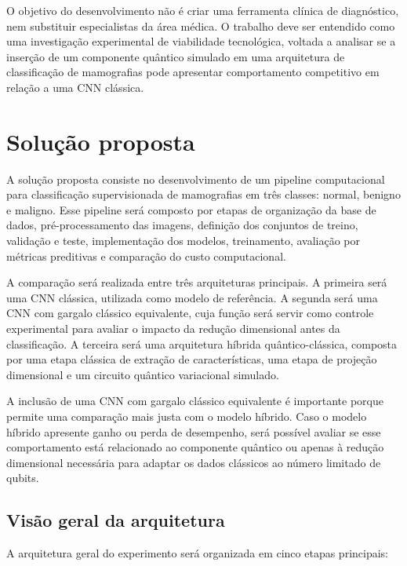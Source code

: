 \documentclass[
    12pt,
    openright,
    oneside,
    a4paper,
    english,
    brazil
]{abntex2}
\begin{document}
O objetivo do desenvolvimento não é criar uma ferramenta clínica de diagnóstico, nem substituir especialistas da área médica. O trabalho deve ser entendido como uma investigação experimental de viabilidade tecnológica, voltada a analisar se a inserção de um componente quântico simulado em uma arquitetura de classificação de mamografias pode apresentar comportamento competitivo em relação a uma CNN clássica.

\section{Solução proposta}
\label{sec:solucao}

A solução proposta consiste no desenvolvimento de um pipeline computacional para classificação supervisionada de mamografias em três classes: normal, benigno e maligno. Esse pipeline será composto por etapas de organização da base de dados, pré-processamento das imagens, definição dos conjuntos de treino, validação e teste, implementação dos modelos, treinamento, avaliação por métricas preditivas e comparação do custo computacional.

A comparação será realizada entre três arquiteturas principais. A primeira será uma CNN clássica, utilizada como modelo de referência. A segunda será uma CNN com gargalo clássico equivalente, cuja função será servir como controle experimental para avaliar o impacto da redução dimensional antes da classificação. A terceira será uma arquitetura híbrida quântico-clássica, composta por uma etapa clássica de extração de características, uma etapa de projeção dimensional e um circuito quântico variacional simulado.

A inclusão de uma CNN com gargalo clássico equivalente é importante porque permite uma comparação mais justa com o modelo híbrido. Caso o modelo híbrido apresente ganho ou perda de desempenho, será possível avaliar se esse comportamento está relacionado ao componente quântico ou apenas à redução dimensional necessária para adaptar os dados clássicos ao número limitado de qubits.

\subsection{Visão geral da arquitetura}
\label{subsec:visao_arquitetura}

A arquitetura geral do experimento será organizada em cinco etapas principais:
\end{document}
